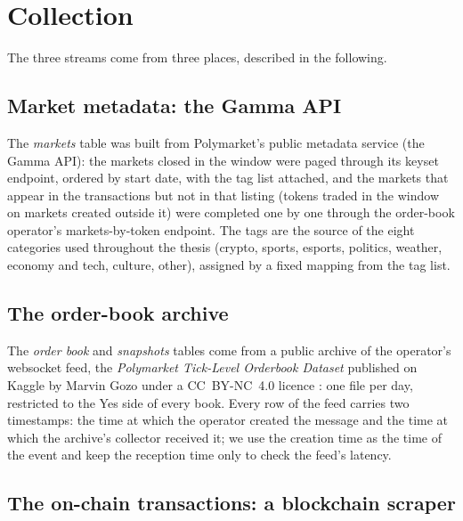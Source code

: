 \section{Collection}
\label{sec:data:collection}

The three streams come from three places, described in the following.

\subsection{Market metadata: the Gamma API}

The \emph{markets} table was built from Polymarket's public metadata service (the Gamma
API): the markets closed in the window were paged through its keyset endpoint, ordered by
start date, with the tag list attached, and the markets that appear in the transactions but
not in that listing (tokens traded in the window on markets created outside it) were
completed one by one through the order-book operator's markets-by-token endpoint.  The tags
are the source of the eight categories used throughout the thesis (crypto, sports, esports,
politics, weather, economy and tech, culture, other), assigned by a fixed mapping from the
tag list.

\subsection{The order-book archive}

The \emph{order book} and \emph{snapshots} tables come from a public archive of the
operator's websocket feed, the \emph{Polymarket Tick-Level Orderbook Dataset} published on
Kaggle by Marvin Gozo under a CC~BY-NC~4.0 licence \cite{gozo2026polymarket}: one file per
day, restricted to the Yes side of every book.  Every row
of the feed carries two timestamps: the time at which the operator created the message and
the time at which the archive's collector received it; we use the creation time as
the time of the event and keep the reception time only to check the feed's latency.

\subsection{The on-chain transactions: a blockchain scraper}

